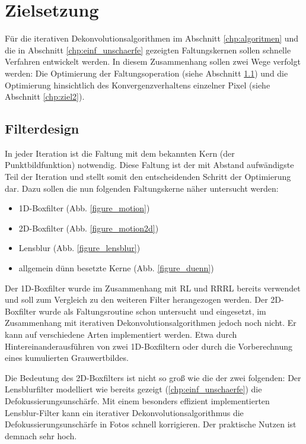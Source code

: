 \documentclass[a4paper,12pt]{article}
\begin{document}
\newpage

\section{Zielsetzung}
Für die iterativen Dekonvolutionsalgorithmen im Abschnitt \ref{chp:algoritmen}
und die in Abschnitt \ref{chp:einf_unschaerfe} gezeigten Faltungskernen sollen
schnelle Verfahren entwickelt werden. In diesem Zusammenhang sollen zwei Wege
verfolgt werden: Die Optimierung der Faltungsoperation (siehe
Abschnitt \ref{chp:ziel1}) und die Optimierung hinsichtlich des
Konvergenzverhaltens einzelner Pixel (siehe Abschnitt \ref{chp:ziel2}).

\subsection{Filterdesign} \label{chp:ziel1}

In jeder Iteration ist die Faltung mit dem bekannten Kern (der
Punktbildfunktion) notwendig. Diese Faltung ist der mit Abstand aufwändigste Teil 
der Iteration und stellt somit den entscheidenden Schritt der Optimierung
dar. Dazu sollen die nun folgenden Faltungskerne näher untersucht werden:

\begin{itemize}
  \itemsep -1pt 
  \item 1D-Boxfilter (Abb. \ref{figure_motion})
  \item 2D-Boxfilter (Abb. \ref{figure_motion2d})
  \item Lensblur (Abb. \ref{figure_lensblur})
  \item allgemein dünn besetzte Kerne (Abb. \ref{figure_duenn})
\end{itemize}

Der 1D-Boxfilter wurde im Zusammenhang mit RL und RRRL bereits verwendet und
soll zum Vergleich zu den weiteren Filter herangezogen werden. Der 2D-Boxfilter
wurde als Faltungsroutine schon untersucht und eingesetzt, im Zusammenhang mit
iterativen Dekonvolutionsalgorithmen jedoch noch nicht. Er kann auf verschiedene
Arten implementiert werden. Etwa durch Hintereinanderausführen von zwei
1D-Boxfiltern oder durch die Vorberechnung eines kumulierten Grauwertbildes. 

Die Bedeutung des 2D-Boxfilters ist nicht so groß wie die der zwei folgenden:
Der Lensblurfilter modelliert wie bereits gezeigt (\ref{chp:einf_unschaerfe})
die Defokussierungsunschärfe. Mit einem besonders effizient implementierten
Lensblur-\-Filter kann ein iterativer Dekonvolutions\-algorithmus die
Defokussierungsunschärfe in Fotos schnell korrigieren. Der praktische Nutzen ist
demnach sehr hoch.
\end{document}
